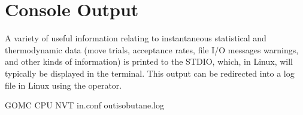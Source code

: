\documentclass[letterpaper,10pt,english]{sphinxmanual}
\begin{document}
\section{Console Output}
\label{\detokenize{output_file:console-output}}
\sphinxAtStartPar
A variety of useful information relating to instantaneous statistical and thermodynamic data (move trials, acceptance rates, file I/O messages warnings, and other kinds of information) is printed to the STDIO, which, in Linux, will typically be displayed in the terminal. This output can be redirected into a log file in Linux using the \sphinxcode{\sphinxupquote{\textgreater{}}} operator.

\begin{sphinxVerbatim}[commandchars=\\\{\}]
\PYGZdl{} GOMC CPU NVT in.conf \PYGZgt{} out\PYGZus{}isobutane.log 
\end{sphinxVerbatim}
\end{document}

